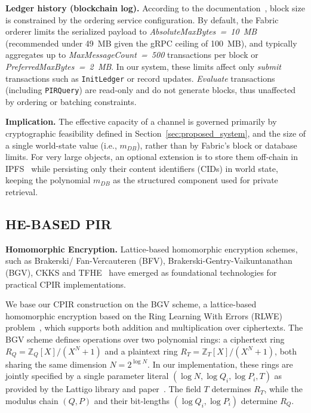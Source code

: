 \documentclass[letterpaper,journal]{IEEEtran}
\begin{document}
\textbf{Ledger history (blockchain log).}
According to the documentation~\cite{fabric_docs_a_nodate}, block size is constrained by the ordering service configuration. 
By default, the Fabric orderer limits the serialized payload to \emph{AbsoluteMaxBytes~=~10~MB} (recommended under 49~MB given the gRPC ceiling of 100~MB), 
and typically aggregates up to \emph{MaxMessageCount~=~500} transactions per block or \emph{PreferredMaxBytes~=~2~MB}.
In our system, these limits affect only \emph{submit} transactions such as \texttt{InitLedger} or record updates. 
\emph{Evaluate} transactions (including \texttt{PIRQuery}) are read-only and do not generate blocks, thus unaffected by ordering or batching constraints.

\textbf{Implication.}
The effective capacity of a channel is governed primarily by cryptographic feasibility defined in Section~\ref{sec:proposed_system},
and the size of a single world-state value (i.e., \emph{$m_{DB}$}), rather than by Fabric’s block or database limits. 
For very large objects, an optional extension is to store them off-chain 
in IPFS~\cite{benet_ipfs_2014} while persisting only their content identifiers (CIDs) in world state, 
keeping the polynomial \emph{$m_{DB}$} as the structured component used for private retrieval.

\subsection{HE-BASED PIR}
\textbf{Homomorphic Encryption.}
Lattice-based homomorphic encryption schemes, such as Brakerski/ Fan-Vercauteren (BFV), Brakerski-Gentry-Vaikuntanathan 
(BGV), CKKS and TFHE~\cite{cryptoeprint:2012/144,cryptoeprint:2011/277,cheon_homomorphic_2017,cryptoeprint:2018/421} have emerged as 
foundational technologies for practical CPIR implementations.

We base our CPIR construction on the BGV scheme, a lattice-based homomorphic encryption based on 
the Ring Learning With Errors (RLWE) problem~\cite{peikert_lattice_2014}, which supports both addition and multiplication over ciphertexts.
The BGV scheme defines operations over two polynomial rings: 
a ciphertext ring $R_Q = \mathbb{Z}_Q[X]/(X^N+1)$ and a plaintext ring $R_T = \mathbb{Z}_T[X]/(X^N+1)$, 
both sharing the same dimension $N=2^{\log N}$. 
In our implementation, these rings are jointly specified by a single parameter literal 
$(\log N, \log Q_i, \log P_i, T)$ as provided by the Lattigo library \cite{noauthor_lattigo_2024} and paper~\cite{mouchet_multiparty_2020}.
The field $T$ determines $R_T$, while the modulus chain $(Q,P)$ and their bit-lengths $(\log Q_i, \log P_i)$ 
determine $R_Q$.
\end{document}
